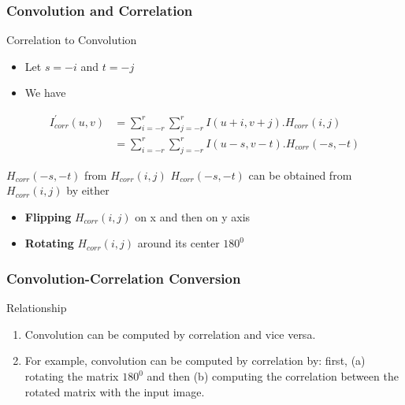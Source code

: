 \documentclass[english,11pt,table,handout]{beamer}
\begin{document}
\frame
{
	\frametitle{Convolution and Correlation}
	
	\begin{block}{Correlation to Convolution}
	\begin{itemize}
	\item Let $s=-i$ and $t=-j$ 
	\item We have
	\end{itemize}
	\begin{equation*} 
	\begin{split}
	I_{corr}^{'}{(u,v)} &= \sum_{i=-r}^{r}{\sum_{j=-r}^{r}{I(u+i, v+j).H_{corr}{(i,j)}}} \\
	&= \sum_{i=-r}^{r}{\sum_{j=-r}^{r}{I(u-s, v-t).H_{corr}{(-s,-t)}}} 
	\end{split}
	\end{equation*}
	\end{block}
	\begin{alertblock}{$H_{corr}{(-s,-t)}$ from $H_{corr}{(i,j)}$}
	$H_{corr}{(-s,-t)}$ can be obtained from $H_{corr}{(i,j)}$ by either
	\begin{itemize}
	\item \textbf{Flipping} $H_{corr}{(i,j)}$ on x and then on y axis
	\item \textbf{Rotating} $H_{corr}{(i,j)}$ around its center $180^0$
	\end{itemize}
	\end{alertblock}
	
}
\frame
{
	\frametitle{Convolution-Correlation Conversion}
	\begin{alertblock}{Relationship}
	\begin{enumerate}
		
		\item Convolution can be computed by correlation and vice versa.
		
		\item For example, convolution can be computed by correlation by: first, \alert{(a)} rotating the matrix $180^0$ and then \alert{(b)} computing the correlation between the rotated matrix with the input image.
		
	\end{enumerate}
	
	\end{alertblock}
}
\end{document}
